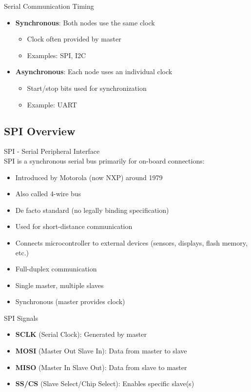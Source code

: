 \begin{definition}{Serial Communication Timing}
\begin{itemize}
    \item \textbf{Synchronous}: Both nodes use the same clock
    \begin{itemize}
        \item Clock often provided by master
        \item Examples: SPI, I2C
    \end{itemize}
    \item \textbf{Asynchronous}: Each node uses an individual clock
    \begin{itemize}
        \item Start/stop bits used for synchronization
        \item Example: UART
    \end{itemize}
\end{itemize}
\end{definition}

\subsection{SPI Overview}

\begin{concept}{SPI - Serial Peripheral Interface}\\
SPI is a synchronous serial bus primarily for on-board connections:
\begin{itemize}
    \item Introduced by Motorola (now NXP) around 1979
    \item Also called 4-wire bus
    \item De facto standard (no legally binding specification)
    \item Used for short-distance communication
    \item Connects microcontroller to external devices (sensors, displays, flash memory, etc.)
    \item Full-duplex communication
    \item Single master, multiple slaves
    \item Synchronous (master provides clock)
\end{itemize}
\end{concept}

\begin{definition}{SPI Signals}
\begin{itemize}
    \item \textbf{SCLK} (Serial Clock): Generated by master
    \item \textbf{MOSI} (Master Out Slave In): Data from master to slave
    \item \textbf{MISO} (Master In Slave Out): Data from slave to master
    \item \textbf{SS/CS} (Slave Select/Chip Select): Enables specific slave(s)
\end{itemize}
\end{definition}


